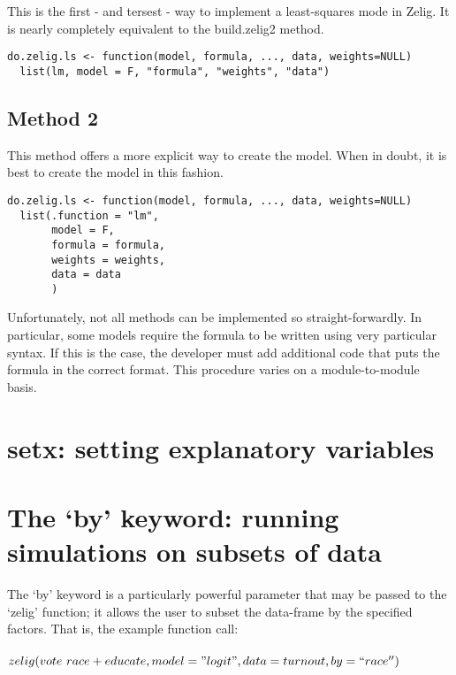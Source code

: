This is the first - and tersest - way to implement a least-squares mode in Zelig.  It is nearly completely equivalent to the build.zelig2 method.

\begin{verbatim}
do.zelig.ls <- function(model, formula, ..., data, weights=NULL) 
  list(lm, model = F, "formula", "weights", "data")
\end{verbatim}

\vspace{3 mm}

\subsection*{Method 2}

This method offers a more explicit way to create the model.  When in doubt, it is best to create the model in this fashion.

\begin{verbatim}
do.zelig.ls <- function(model, formula, ..., data, weights=NULL)
  list(.function = "lm",
       model = F,
       formula = formula,
       weights = weights,
       data = data
       )
\end{verbatim}

\vspace{6 mm}

Unfortunately, not all methods can be implemented so straight-forwardly.  In particular, some models require the formula to be written using very particular syntax.  If this is the case, the developer must add additional code that puts the formula in the correct format.  This procedure varies on a module-to-module basis.


\section{setx: setting explanatory variables}


\section{The `by' keyword: running simulations on subsets of data}

The `by' keyword is a particularly powerful parameter that may be passed to the `zelig' function; it allows the user to subset the data-frame by the specified factors.  That is, the example function call: \\ \\
$ zelig(vote ~ race + educate, model="logit", data=turnout, by=``race'') $ \\

